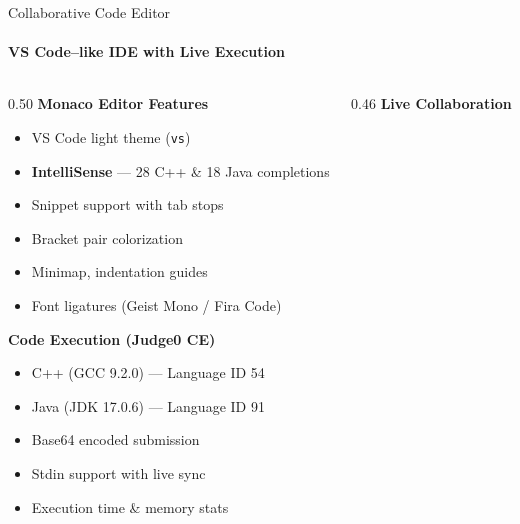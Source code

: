 \documentclass[aspectratio=169, 12pt]{beamer}
\begin{document}
\begin{frame}{Collaborative Code Editor}
  \framesubtitle{VS Code--like IDE with Live Execution}
  \begin{columns}[T]
    \begin{column}{0.50\textwidth}
      \vspace{0.3em}
      {\small\bfseries\color{MeetDark} Monaco Editor Features}
      \vspace{0.3em}
      \begin{itemize}\setlength{\itemsep}{0.3em}
        \item VS Code light theme (\texttt{vs})
        \item \textbf{IntelliSense} --- 28 C++ \& 18 Java completions
        \item Snippet support with tab stops
        \item Bracket pair colorization
        \item Minimap, indentation guides
        \item Font ligatures (Geist Mono / Fira Code)
      \end{itemize}

      \vspace{0.5em}
      {\small\bfseries\color{MeetDark} Code Execution (Judge0 CE)}
      \vspace{0.3em}
      \begin{itemize}\setlength{\itemsep}{0.3em}
        \item C++ (GCC 9.2.0) --- Language ID 54
        \item Java (JDK 17.0.6) --- Language ID 91
        \item Base64 encoded submission
        \item Stdin support with live sync
        \item Execution time \& memory stats
      \end{itemize}
    \end{column}

    \begin{column}{0.46\textwidth}
      \vspace{0.2em}
      {\small\bfseries\color{MeetDark} Live Collaboration}
      \vspace{0.3em}
\end{column}
\end{columns}
\end{frame}
\end{document}
